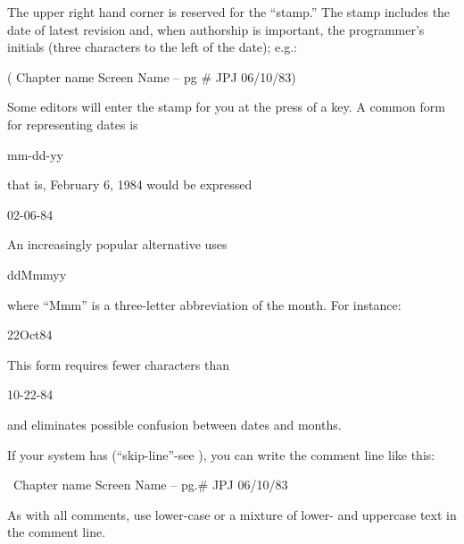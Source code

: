 The upper right hand corner is reserved for the ``stamp.'' The stamp
includes the date of latest revision and, when authorship is important,
the programmer's initials (three characters to the left of the date); e.g.:
\begin{Code}
( Chapter name          Screen Name -- pg #       JPJ 06/10/83)
\end{Code}
Some \Forth{} editors will enter the stamp for you at the press of a key.
A common form for representing dates is
\begin{Code}
mm-dd-yy
\end{Code}
that is, February 6, 1984 would be expressed
\begin{Code}
02-06-84
\end{Code}
An increasingly popular alternative uses
\begin{Code}
ddMmmyy
\end{Code}
where ``Mmm'' is a three-letter abbreviation of the month.  For instance:
\begin{Code}
22Oct84
\end{Code}
This form requires fewer characters than
\begin{Code}
10-22-84
\end{Code}
and eliminates possible confusion between dates and months.

If your system has \forth{\bs} (``skip-line''-see ), you can write
the comment line like this:
\begin{Code}
\ Chapter name          Screen Name -- pg.#         JPJ 06/10/83
\end{Code}
As with all comments, use lower-case or a mixture of lower- and uppercase
text in the comment line.

